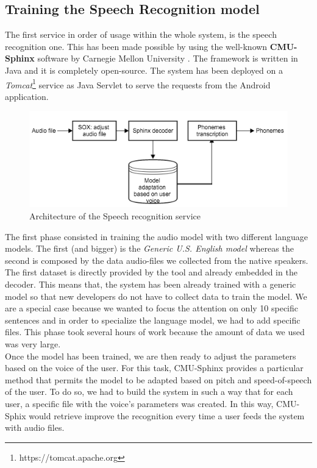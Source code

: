 \subsection{Training the Speech Recognition model} 
\label{ssec:training_sr_model}

The first service in order of usage within the whole system, is the speech recognition one. This has been made possible by using the well-known \textbf{CMU-Sphinx} software by Carnegie Mellon University \cite{walker2004sphinx}. The framework is written in Java and it is completely open-source. The system has been deployed on a \textit{Tomcat}\footnote{https://tomcat.apache.org} service as Java Servlet to serve the requests from the Android application. \\

\begin{figure}[!ht]
	\centering
	\includegraphics[scale=0.6]{Figures/sphinx_service.png}
	\caption{Architecture of the Speech recognition service}
	\label{fig:sphinx_service}
\end{figure}

\noindent The first phase consisted in training the audio model with two different language models. The first (and bigger) is the \textit{Generic U.S. English model} whereas the second is composed by the data audio-files we collected from the native speakers. The first dataset is directly provided by the tool and already embedded in the decoder. This means that, the system has been already trained with a generic model so that new developers do not have to collect data to train the model. We are a special case because we wanted to focus the attention on only 10 specific sentences and in order to specialize the language model, we had to add specific files. This phase took several hours of work because the amount of data we used was very large. \\

\noindent Once the model has been trained, we are then ready to adjust the parameters based on the voice of the user. For this task, CMU-Sphinx provides a particular method that permits the model to be adapted based on pitch and speed-of-speech of the user. To do so, we had to build the system in such a way that for each user, a specific file with the voice's parameters was created. In this way, CMU-Sphix would retrieve improve the recognition every time a user feeds the system with audio files. \\

